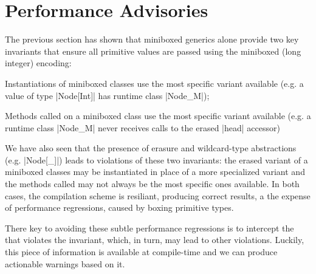 \section{Performance Advisories}
\label{sec:advisories}

The previous section has shown that miniboxed generics alone provide two key invariants that ensure all primitive values are passed using the miniboxed (long integer) encoding:

\begin{compactitem}
\item Instantiations of miniboxed classes use the most specific variant available (e.g. a value of type |Node[Int]| has runtime class |Node_M|);
\item Methods called on a miniboxed class use the most specific variant available (e.g. a runtime class |Node_M| never receives calls to the erased |head| accessor)
\end{compactitem}

We have also seen that the presence of erasure and wildcard-type abstractions (e.g. |Node[_]|) leads to violations of these two invariants: the erased variant of a miniboxed classes may be instantiated in place of a more specialized variant and the methods called may not always be the most specific ones available. In both cases, the compilation scheme is resiliant, producing correct results, a the expense of performance regressions, caused by boxing primitive types.

There key to avoiding these subtle performance regressions is to intercept the  that violates the invariant, which, in turn, may lead to other violations. Luckily, this piece of information is available at compile-time and we can produce actionable warnings based on it.



